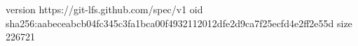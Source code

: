 version https://git-lfs.github.com/spec/v1
oid sha256:aabeceabcb04fc345c3fa1bca00f4932112012dfe2d9ca7f25ecfd4e2ff2e55d
size 226721
